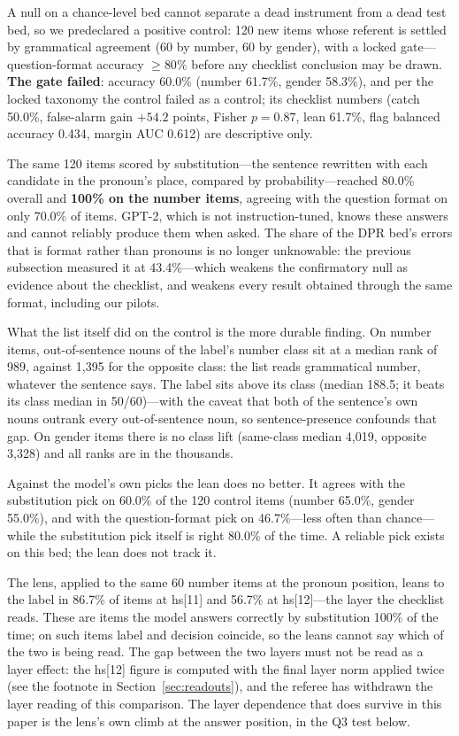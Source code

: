 \documentclass[11pt]{article}
\begin{document}
A null on a chance-level bed cannot separate a dead instrument from a dead test bed, so we predeclared a positive control: 120 new items
whose referent is settled by grammatical agreement (60 by number, 60
by gender), with a locked gate---question-format accuracy $\ge 80\%$
before any checklist conclusion may be drawn. \textbf{The gate
failed}: accuracy 60.0\% (number 61.7\%, gender 58.3\%), and per the
locked taxonomy the control failed as a control; its checklist numbers
(catch 50.0\%, false-alarm gain $+54.2$ points, Fisher $p = 0.87$,
lean 61.7\%, flag balanced accuracy 0.434, margin AUC 0.612) are
descriptive only.

The same 120 items scored by substitution---the sentence rewritten
with each candidate in the pronoun's place, compared by
probability---reached 80.0\% overall and \textbf{100\% on the number
items}, agreeing with the question format on only 70.0\% of items.
GPT-2, which is not instruction-tuned, knows these answers and cannot
reliably produce them when asked. The share of the DPR bed's errors
that is format rather than pronouns is no longer unknowable: the
previous subsection measured it at 43.4\%---which weakens the
confirmatory null as evidence about the checklist, and weakens every
result obtained through the same format, including our pilots.

What the list itself did on the control is the more durable finding.
On number items, out-of-sentence nouns of the label's number class sit
at a median rank of 989, against 1,395 for the opposite class: the
list reads grammatical number, whatever the sentence says. The label
sits above its class (median 188.5; it beats its class median in
50/60)---with the caveat that both of the sentence's own nouns outrank
every out-of-sentence noun, so sentence-presence confounds that gap.
On gender items there is no class lift (same-class median 4,019, opposite 3,328) and all ranks are in the thousands.

Against the model's own picks the lean does no better. It agrees with
the substitution pick on 60.0\% of the 120 control items (number
65.0\%, gender 55.0\%), and with the question-format pick on
46.7\%---less often than chance---while the substitution pick itself
is right 80.0\% of the time. A reliable pick exists on this bed; the
lean does not track it.

The lens, applied to the same 60 number items at the pronoun
position, leans to the label in 86.7\% of items at hs[11] and 56.7\%
at hs[12]---the layer the checklist reads. These are items the model answers correctly by substitution 100\% of the time; on such items label and decision coincide, so the leans cannot say which of the two is being read. The gap between
the two layers must not be read as a layer effect: the hs[12] figure
is computed with the final layer norm applied twice (see the footnote
in Section~\ref{sec:readouts}), and the referee has withdrawn the
layer reading of this comparison. The layer dependence that does
survive in this paper is the lens's own climb at the answer position,
in the Q3 test below.
\end{document}

